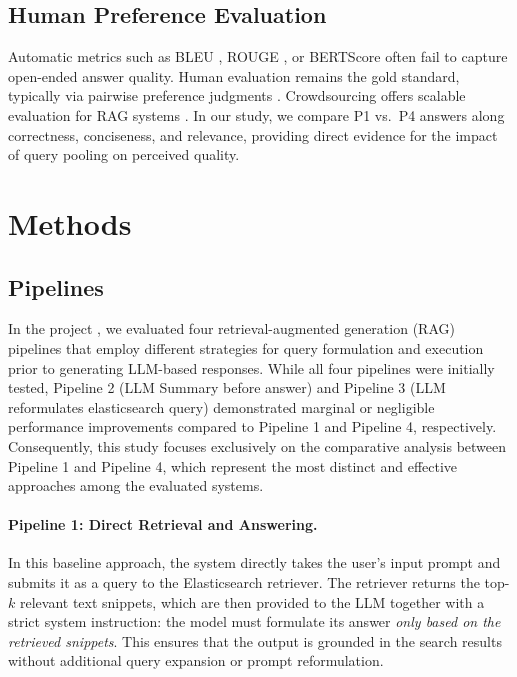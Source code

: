 \documentclass[manuscript,screen]{acmart}
\begin{document}
\begin{CCSXML}
	\subsection{Human Preference Evaluation}
	\label{subsec:human-preference-eval}
	Automatic metrics such as BLEU \cite{post-2018-call}, ROUGE \cite{lin-2004-rouge}, or BERTScore \cite{zhang2020bertscoreevaluatingtextgeneration} often fail to capture open-ended answer quality. Human evaluation remains the gold standard, typically via pairwise preference judgments \cite{bai2022traininghelpfulharmlessassistant,stiennon2022learningsummarizehumanfeedback}. Crowdsourcing offers scalable evaluation for RAG systems \cite{Gienapp_2025}. In our study, we compare P1 vs.~P4 answers along correctness, conciseness, and relevance, providing direct evidence for the impact of query pooling on perceived quality.

\section{Methods}

	\subsection{Pipelines}
	\label{subsec:pipelines}
	
	In the project \cite{repo}, we evaluated four retrieval-augmented generation (RAG) pipelines that employ different strategies for query formulation and execution prior to generating LLM-based responses. While all four pipelines were initially tested, Pipeline 2 (LLM Summary before answer) and Pipeline 3 (LLM reformulates elasticsearch query) demonstrated marginal or negligible performance improvements compared to Pipeline 1 and Pipeline 4, respectively. Consequently, this study focuses exclusively on the comparative analysis between Pipeline 1 and Pipeline 4, which represent the most distinct and effective approaches among the evaluated systems.
	
	\paragraph{Pipeline 1: Direct Retrieval and Answering.}
	In this baseline approach, the system directly takes the user’s input prompt
	and submits it as a query to the Elasticsearch retriever. The retriever returns the top-$k$ relevant text
	snippets, which are then provided to the LLM together with a
	strict system instruction: the model must formulate its answer \emph{only based
	on the retrieved snippets}. This ensures that the output is grounded in the
	search results without additional query expansion or prompt reformulation.
	

\end{CCSXML}
\end{document}
